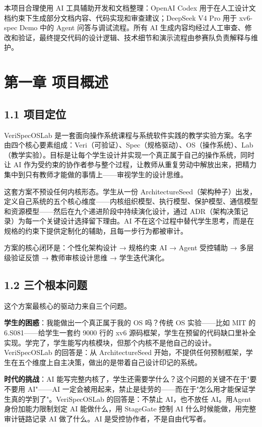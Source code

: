 \documentclass[UTF8,a4paper,12pt,openany]{ctexrep}
\begin{document}
本项目合理使用 AI 工具辅助开发和文档整理：OpenAI Codex 用于在人工设计文档约束下生成部分文档内容、代码实现和审查建议；DeepSeek V4 Pro 用于 xv6-spec Demo 中的 Agent 问答与调试流程。所有 AI 生成内容均经过人工审查、修改和验证，最终提交代码的设计逻辑、技术细节和演示流程由参赛队负责解释与维护。

\tableofcontents
\clearpage
{}
\chapter{第一章 项目概述}\label{ux7b2cux4e00ux7ae0-ux9879ux76eeux6982ux8ff0}

\section{1.1 项目定位}\label{11-ux9879ux76eeux5b9aux4f4d}

VeriSpecOSLab 是一套面向操作系统课程与系统软件实践的教学实验方案。名字由四个核心要素组成：Veri（可验证）、Spec（规格驱动）、OS（操作系统）、Lab（教学实验）。目标是让每个学生设计并实现一个真正属于自己的操作系统，同时让 AI 作为受约束的协作者参与整个过程，让教师从重复劳动中解放出来，把精力集中到只有教师才能做的事情上------审视学生的设计思维。

这套方案不预设任何内核形态。学生从一份 ArchitectureSeed（架构种子）出发，定义自己系统的五个核心维度------内核组织模型、执行模型、保护模型、通信模型和资源模型------然后在九个递进阶段中持续演化设计，通过 ADR（架构决策记录）为每一个关键设计选择留下理由。AI 不在这个过程中替代学生思考，而是在规格的约束下提供定制化的辅助，且每一步行为都被审计。

方案的核心闭环是：个性化架构设计 → 规格约束 AI → Agent 受控辅助 → 多层级验证反馈 → 教师审核设计思维 → 学生迭代演化。

\section{1.2 三个根本问题}\label{12-ux4e09ux4e2aux6839ux672cux95eeux9898}

这个方案最核心的驱动力来自三个问题。

\textbf{学生的困惑}：我能做出一个真正属于我的 OS 吗？传统 OS 实验------比如 MIT 的 6.S081------给学生一套约 9000 行的 xv6 源码框架，学生在预留的代码缺口里补全实现。学完了，学生能写内核模块，但那个内核不是他自己的设计。VeriSpecOSLab 的回答是：从 ArchitectureSeed 开始，不提供任何预制框架，学生在五个维度上自主决策，做出的是带着自己设计印记的系统。

\textbf{时代的挑战}：AI 能写完整内核了，学生还需要学什么？这个问题的关键不在于"要不要用 AI"------AI 一定会被用起来，禁止是徒劳的------而在于"怎么用才能保证学生真的学到了"。VeriSpecOSLab 的回答是：不禁止 AI，也不放任 AI。用Agent 身份加能力限制划定 AI 能做什么，用 StageGate 控制 AI 什么时候能做，用完整审计链路记录 AI 做了什么。AI 是受控协作者，不是自由代写者。
\end{document}
